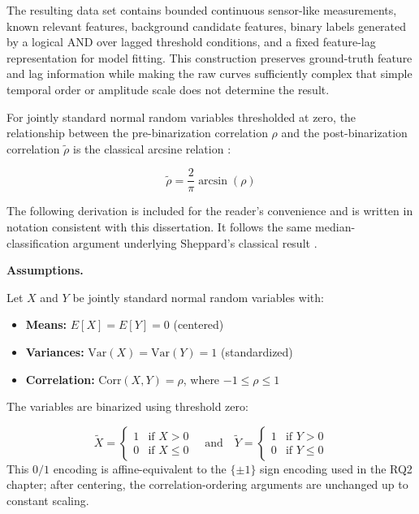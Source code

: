 The resulting data set contains bounded continuous sensor-like measurements, known relevant features, background candidate features, binary labels generated by a logical AND over lagged threshold conditions, and a fixed feature-lag representation for model fitting. This construction preserves ground-truth feature and lag information while making the raw curves sufficiently complex that simple temporal order or amplitude scale does not determine the result.


\begin{lemma}\label{lem:app-arcsin-correlation-map}
For jointly standard normal random variables thresholded at zero, the relationship between the pre-binarization correlation $ \rho $ and the post-binarization correlation $ \tilde{\rho} $ is the classical arcsine relation \cite{WFSheppard1899Application}:

\begin{equation}\label{eq:app-lemma1-arcsin-map}
\tilde{\rho} = \frac{2}{\pi} \arcsin(\rho)
\end{equation}
\end{lemma}

The following derivation is included for the reader's convenience and is written in notation consistent with this dissertation. It follows the same median-classification argument underlying Sheppard's classical result \cite{WFSheppard1899Application}.

\noindent\textbf{Assumptions.}

Let $ X $ and $ Y $ be jointly standard normal random variables with:

\begin{itemize}
	\setlength\itemsep{-0.5em} %
	\item \textbf{Means:} $ E[X] = E[Y] = 0 $ (centered)
	\item \textbf{Variances:} $ \text{Var}(X) = \text{Var}(Y) = 1 $ (standardized)
	\item \textbf{Correlation:} $ \text{Corr}(X, Y) = \rho$, where $ -1 \leq \rho \leq 1 $
\end{itemize}		

The variables are binarized using threshold zero:

\begin{equation}\label{eq:app-lemma1-binarized-variables}
\tilde{X} = \begin{cases}
	1 & \text{if } X > 0 \\
	0 & \text{if } X \leq 0
\end{cases}
\quad \text{and} \quad
\tilde{Y} = \begin{cases}
	1 & \text{if } Y > 0 \\
	0 & \text{if } Y \leq 0
\end{cases}
\end{equation}
This $0/1$ encoding is affine-equivalent to the $\{\pm1\}$ sign encoding used in the RQ2 chapter; after centering, the correlation-ordering arguments are unchanged up to constant scaling.

